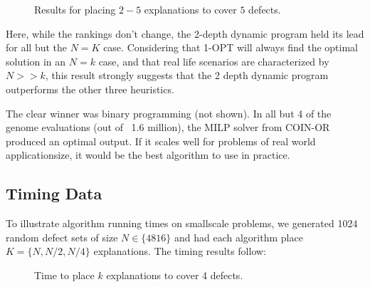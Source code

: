 \documentclass[11pt,twocolumn]{article}
\begin{document}
\begin{figure}[ht!]
  \caption{Results for placing $2-5$ explanations to cover $5$ defects.}
\end{figure}
\FloatBarrier
Here, while the rankings don't change, the 2-depth dynamic program held its lead for all but the $N=K$ case.  Considering that 1-OPT will always find the optimal solution in an $N=k$ case, and that real life scenarios are characterized by $N>>k$, this result strongly suggests that the 2 depth dynamic program outperforms the other three heuristics.  

The clear winner was binary programming (not shown).  In all but 4 of the genome evaluations (out of ~1.6 million), the MILP solver from COIN-OR produced an optimal output.  If it scales well for problems of real world applicationsize, it would be the best algorithm to use in practice.

\FloatBarrier

\subsection{Timing Data}

To illustrate algorithm running times on smallscale problems, we generated 1024 random defect sets of size $N \in \{4 8 16\}$ and had each algorithm place $K = \{ N, N/2, N/4\}$ explanations.  The timing results follow:

\begin{figure}[ht!]
  \caption{Time to place $k$ explanations to cover 4 defects.}
\end{figure}
\FloatBarrier
\end{document}
